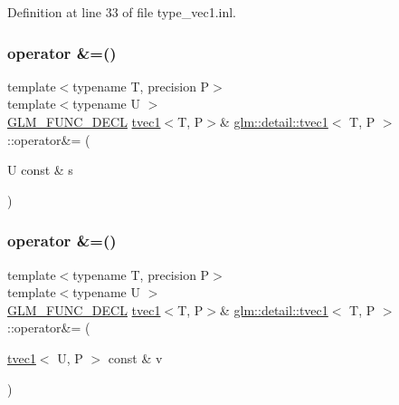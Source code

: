 Definition at line 33 of file type\+\_\+vec1.\+inl.

\mbox{\label{structglm_1_1detail_1_1tvec1_a386c71e88fa7f7e591a98d790b1a0ed5}} 
\subsubsection{\texorpdfstring{operator \&=()}{operator \&=()}\hspace{0.1cm}{\footnotesize\ttfamily [1/2]}}
{\footnotesize\ttfamily template$<$typename T, precision P$>$ \\
template$<$typename U $>$ \\
\hyperlink{setup_8hpp_ab2d052de21a70539923e9bcbf6e83a51}{G\+L\+M\+\_\+\+F\+U\+N\+C\+\_\+\+D\+E\+CL} \hyperlink{structglm_1_1detail_1_1tvec1}{tvec1}$<$T, P$>$\& \hyperlink{structglm_1_1detail_1_1tvec1}{glm\+::detail\+::tvec1}$<$ T, P $>$\+::operator\&= (\begin{DoxyParamCaption}\item[{U const \&}]{s }\end{DoxyParamCaption})}

\mbox{\label{structglm_1_1detail_1_1tvec1_a4f2e9381b9289f4a4977801faf9b2bbb}} 
\subsubsection{\texorpdfstring{operator \&=()}{operator \&=()}\hspace{0.1cm}{\footnotesize\ttfamily [2/2]}}
{\footnotesize\ttfamily template$<$typename T, precision P$>$ \\
template$<$typename U $>$ \\
\hyperlink{setup_8hpp_ab2d052de21a70539923e9bcbf6e83a51}{G\+L\+M\+\_\+\+F\+U\+N\+C\+\_\+\+D\+E\+CL} \hyperlink{structglm_1_1detail_1_1tvec1}{tvec1}$<$T, P$>$\& \hyperlink{structglm_1_1detail_1_1tvec1}{glm\+::detail\+::tvec1}$<$ T, P $>$\+::operator\&= (\begin{DoxyParamCaption}\item[{\hyperlink{structglm_1_1detail_1_1tvec1}{tvec1}$<$ U, P $>$ const \&}]{v }\end{DoxyParamCaption})}

